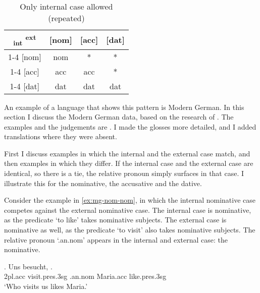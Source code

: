\begin{table}[ht]
  \center
  \caption{Only internal case allowed (repeated)}
  \begin{tabular}{c|c|c|c}
    \toprule
    \textsubscript{\ac{int}} \textsuperscript{\ac{ext}}
           & [\ac{nom}]
           & [\ac{acc}]
           & [\ac{dat}]
           \\ \cmidrule{1-4}
       [\ac{nom}]
           & \ac{nom}
           & *
           & *
           \\ \cmidrule{1-4}
       [\ac{acc}]
           & \ac{acc}
           & \ac{acc}
           & *
           \\ \cmidrule{1-4}
       [\ac{dat}]
           & \ac{dat}
           & \ac{dat}
           & \ac{dat}
           \\
     \bottomrule
  \end{tabular}
    \label{tbl:case-competition-only-int-repeated}
\end{table}

An example of a language that shows this pattern is Modern German. In this section I discuss the Modern German data, based on the research of \citet{vogel2001}. The examples and the judgements are . I made the glosses more detailed, and I added translations where they were absent.

First I discuss examples in which the internal and the external case match, and then examples in which they differ. If the internal case and the external case are identical, so there is a tie, the relative pronoun simply surfaces in that case. I illustrate this for the nominative, the accusative and the dative.

Consider the example in \ref{ex:mg-nom-nom}, in which the internal nominative case competes against the external nominative case.
The internal case is nominative, as the predicate  `to like' takes nominative subjects.
The external case is nominative as well, as the predicate  `to visit' also takes nominative subjects.
The relative pronoun  `.\ac{an}.\ac{nom}' appears in the internal and external case: the nominative.

\exg. Uns besucht,   .\\
 2\ac{pl}.\ac{acc} visit.\ac{pres}.3\ac{sg}\scsub{[nom]} .\ac{an}.\ac{nom} Maria.\ac{acc} like.\ac{pres}.3\ac{sg}\scsub{[nom]}\\
 `Who visits us likes Maria.' \label{ex:mg-nom-nom}

